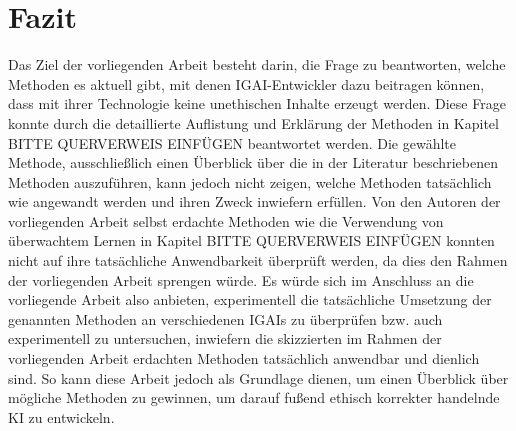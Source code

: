 \documentclass[12pt]{article}
\begin{document}
\chapter{Fazit}
Das Ziel der vorliegenden Arbeit besteht darin, die Frage zu beantworten, welche Methoden es aktuell gibt, mit denen IGAI-Entwickler dazu beitragen können, dass mit ihrer Technologie keine unethischen Inhalte erzeugt werden. Diese Frage konnte durch die detaillierte Auflistung und Erklärung der Methoden in Kapitel BITTE QUERVERWEIS EINFÜGEN beantwortet werden. Die gewählte Methode, ausschließlich einen Überblick über die in der Literatur beschriebenen Methoden auszuführen, kann jedoch nicht zeigen, welche Methoden tatsächlich wie angewandt werden und ihren Zweck inwiefern erfüllen. Von den Autoren der vorliegenden Arbeit selbst erdachte Methoden wie die Verwendung von überwachtem Lernen in Kapitel BITTE QUERVERWEIS EINFÜGEN konnten nicht auf ihre tatsächliche Anwendbarkeit überprüft werden, da dies den Rahmen der vorliegenden Arbeit sprengen würde. Es würde sich im Anschluss an die vorliegende Arbeit also anbieten, experimentell die tatsächliche Umsetzung der genannten Methoden an verschiedenen IGAIs zu überprüfen bzw. auch experimentell zu untersuchen, inwiefern die skizzierten im Rahmen der vorliegenden Arbeit erdachten Methoden tatsächlich anwendbar und dienlich sind.
So kann diese Arbeit jedoch als Grundlage dienen, um einen Überblick über mögliche Methoden zu gewinnen, um darauf fußend ethisch korrekter handelnde KI zu entwickeln.




\end{document}
